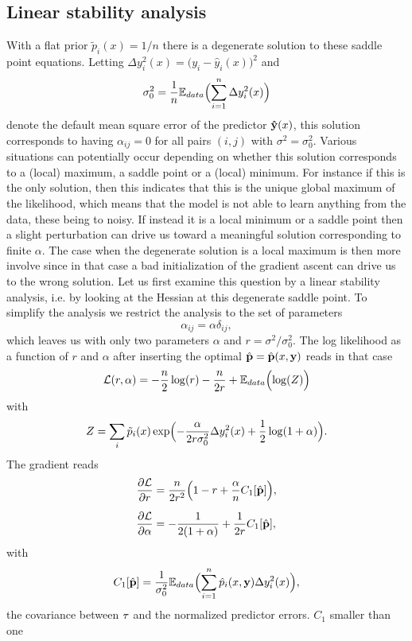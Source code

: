 \documentclass[envcountsect,runningheads]{llncs}
\theoremstyle{etoile}
\begin{document}
\subsection{Linear stability analysis}
With a flat prior $\tilde p_i(x) = 1/n$ there is a degenerate solution to these saddle point equations.
Letting $\Delta y_i^2(x)= \bigl(y_i-\hat y_i(x)\bigr)^2$ and
\[
\sigma_0^2 = \frac{1}{n}{\mathbb E}_{data}\Bigl(\sum_{i=1}^n \Delta y_i^2(x)\Bigr)
\]
denote the default mean square error of the predictor ${\bf \hat y}(x)$, this solution corresponds to having $\alpha_{ij}=0$ for all
pairs $(i,j)$ with $\sigma^2=\sigma_0^2$. Various situations can potentially occur depending on whether this solution corresponds to a (local) maximum, a saddle point or a (local) 
minimum. For instance if this is the only solution, then this indicates that this is the unique global maximum of the likelihood, which means that the model is not able to learn
anything from the data, these being to noisy. If instead it is a local minimum or a saddle point then a slight perturbation can drive us toward a meaningful solution corresponding to finite $\alpha$.
The  case when the degenerate solution is a local maximum is then more involve since in that case a bad initialization of the gradient ascent can drive us to the wrong solution.
Let us first examine this question by a linear stability analysis, i.e. by looking at the Hessian at this degenerate saddle point. To simplify the analysis
we restrict the analysis to the set of parameters
\[
\alpha_{ij} = \alpha \delta_{ij},
\]
which leaves us with only two parameters $\alpha$ and $r = \sigma^2/\sigma_0^2$. The log likelihood as a function of $r$ and $\alpha$ after inserting the optimal
$\hat {\bf p} = \hat {\bf p}(x,{\bf y})$ reads in that case
\[
{\cal L}(r,\alpha) = -\frac{n}{2}\log(r)-\frac{n}{2r}+{\mathbb E}_{data}\Bigl(\log(Z)\Bigr)
\]
with
\[
Z = \sum_i \tilde p_i(x)\exp\Bigl(-\frac{\alpha}{2r\sigma_0^2}\Delta y_i^2(x)+\frac{1}{2}\log(1+\alpha)\Bigr).
\]
The gradient reads
\begin{align*}
  \frac{\partial {\cal L}}{\partial r} &= \frac{n}{2r^2}\Bigl(1-r+\frac{\alpha}{n}C_1[\hat {\bf p}]\Bigr),\\[0.2cm]
  \frac{\partial {\cal L}}{\partial \alpha} &= -\frac{1}{2(1+\alpha)}+\frac{1}{2r}C_1[\hat {\bf p}],  
\end{align*}
with
\[
C_1[\hat {\bf p}] = \frac{1}{\sigma_0^2}{\mathbb E}_{data}\Bigl(\sum_{i=1}^n \hat p_i(x,{\bf y})\Delta y_i^2(x)\Bigr),
\]
the covariance between ${\bf \tau}$ and the normalized predictor errors. $C_1$ smaller than one 
\end{document}
